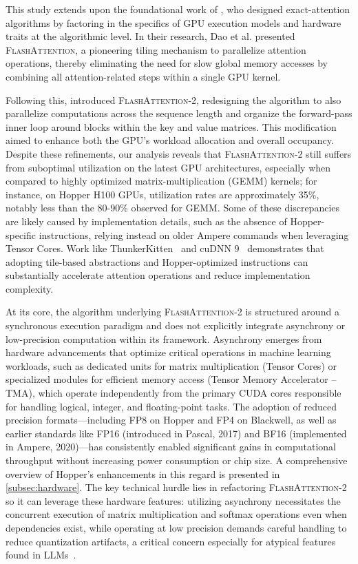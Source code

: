 This study extends upon the foundational work of \citet{dao2022flashattention}, who designed exact-attention algorithms by factoring in the specifics of GPU execution models and hardware traits at the algorithmic level. In their research, Dao et al. presented \textsc{FlashAttention}, a pioneering tiling mechanism to parallelize attention operations, thereby eliminating the need for slow global memory accesses by combining all attention-related steps within a single GPU kernel.

Following this, \citet{dao2023flashattention2} introduced \textsc{FlashAttention-2}, redesigning the algorithm to also parallelize computations across the sequence length and organize the forward-pass inner loop around blocks within the key and value matrices. This modification aimed to enhance both the GPU's workload allocation and overall occupancy. Despite these refinements, our analysis reveals that \textsc{FlashAttention-2} still suffers from suboptimal utilization on the latest GPU architectures, especially when compared to highly optimized matrix-multiplication (GEMM) kernels; for instance, on Hopper H100 GPUs, utilization rates are approximately 35\%, notably less than the 80-90\% observed for GEMM. Some of these discrepancies are likely caused by implementation details, such as the absence of Hopper-specific instructions, relying instead on older Ampere commands when leveraging Tensor Cores. Work like ThunkerKitten~\citep{spector2024thunder} and cuDNN 9~\citep{cudnn9} demonstrates that adopting tile-based abstractions and Hopper-optimized instructions can substantially accelerate attention operations and reduce implementation complexity.

At its core, the algorithm underlying \textsc{FlashAttention-2} is structured around a synchronous execution paradigm and does not explicitly integrate asynchrony or low-precision computation within its framework. Asynchrony emerges from hardware advancements that optimize critical operations in machine learning workloads, such as dedicated units for matrix multiplication (Tensor Cores) or specialized modules for efficient memory access (Tensor Memory Accelerator -- TMA), which operate independently from the primary CUDA cores responsible for handling logical, integer, and floating-point tasks. The adoption of reduced precision formats—including FP8 on Hopper and FP4 on Blackwell, as well as earlier standards like FP16 (introduced in Pascal, 2017) and BF16 (implemented in Ampere, 2020)—has consistently enabled significant gains in computational throughput without increasing power consumption or chip size. A comprehensive overview of Hopper's enhancements in this regard is presented in \cref{subsec:hardware}. The key technical hurdle lies in refactoring \textsc{FlashAttention-2} so it can leverage these hardware features: utilizing asynchrony necessitates the concurrent execution of matrix multiplication and softmax operations even when dependencies exist, while operating at low precision demands careful handling to reduce quantization artifacts, a critical concern especially for atypical features found in LLMs~\citep{dettmers2208llm, sun2024massive}.

